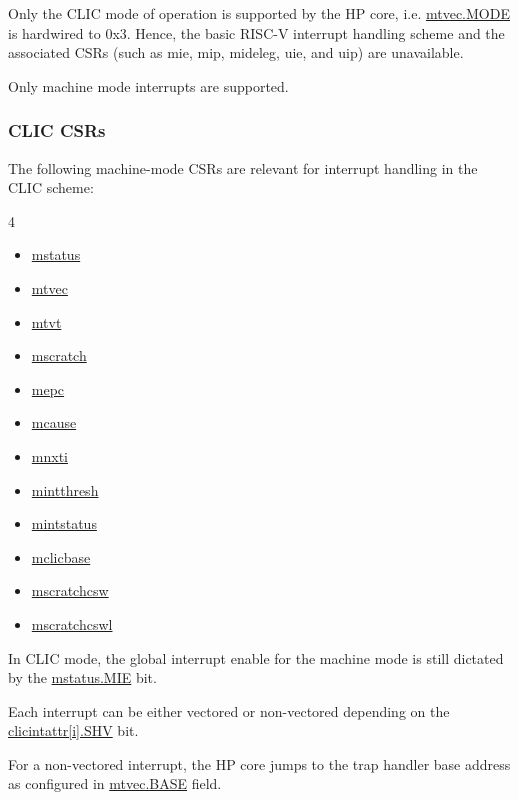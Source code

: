 \documentclass[main\_\_EN.tex]{subfiles}
\begin{document}
Only the CLIC mode of operation is supported by the HP core, i.e. \hyperref[fielddesc:MTVECMODE]{mtvec.MODE} is hardwired to 0x3. Hence, the basic RISC-V interrupt handling scheme and the associated CSRs (such as mie, mip, mideleg, uie, and uip) are unavailable.

Only machine mode interrupts are supported.

\subsubsection{CLIC CSRs}
\label{sec:riscvcpu-clic-csrs}

The following machine-mode CSRs are relevant for interrupt handling in the CLIC scheme:

\begin{multicols}{4}
\begin{itemize}
\item \hyperref[regdesc:MSTATUS]{mstatus}
\item \hyperref[regdesc:MTVEC]{mtvec}
\item \hyperref[regdesc:MTVT]{mtvt}
\item \hyperref[regdesc:MSCRATCH]{mscratch}
\item \hyperref[regdesc:MEPC]{mepc}
\item \hyperref[regdesc:MCAUSE]{mcause}
\item \hyperref[regdesc:MNXTI_REG]{mnxti}
\item \hyperref[regdesc:MINTTHRESH]{mintthresh}
\item \hyperref[regdesc:MINTSTATUS]{mintstatus}
\item \hyperref[regdesc:MCLICBASE_REG]{mclicbase}
\item \hyperref[regdesc:MSCRATCHCSW_REG]{mscratchcsw}
\item \hyperref[regdesc:MSCRATCHCSWL_REG]{mscratchcswl}
\end{itemize}
\end{multicols}




In CLIC mode, the global interrupt enable for the machine
mode is still dictated by the \hyperref[fielddesc:MSTATUSMIE]{mstatus.MIE} bit.


Each interrupt can be either vectored or non-vectored depending on the \hyperref[fielddesc:MCLICINTATTR_i_SHV]{clicintattr[i].SHV} bit.

For a non-vectored interrupt, the HP core jumps to the trap handler base address as configured in \hyperref[fielddesc:MTVECBASE]{mtvec.BASE} field.
\end{document}
